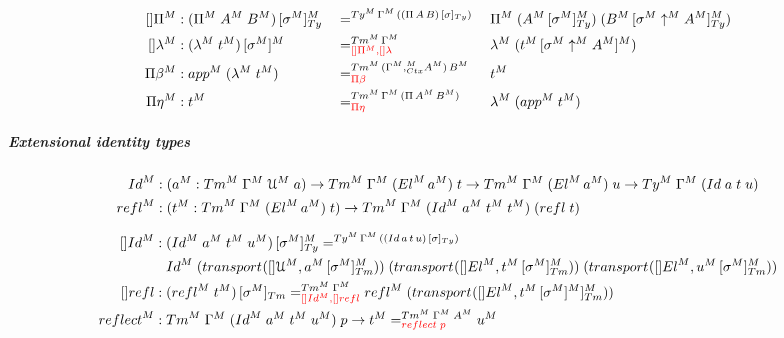 \documentclass[a4paper,UKenglish,numberwithinsect,cleveref,thm-restate]{lipics-v2021}
\begin{document}
\begin{alignat*}{5}
  []\Pi^M         & : \subTyM{(\Pi^M\;A^M\;B^M)}{\sigma^M}  && =^{\Ty^M\,\Gamma^M\,\left(\subTy{(\Pi\,A\,B)}{\sigma}\right)} {} && \Pi^M\;(\subTyM{A^M}{\sigma^M})\;(\subTyM{B^M}{\sigma^M \uparrow^M A^M}) \\
  []\lambda^M     & : \subM{(\lambda^M\;t^M)}{\sigma^M}     && =^{\Tm^M\,\Gamma^M}_{\alert{[]\Pi^M, []\lambda}} {} && \lambda^M\;(\subM{t^M}{\sigma^M \uparrow^M A^M}) \\
  \Pi\beta^M      & : \mathsf{app}^M\;(\lambda^M\;t^M)      && =^{\Tm^M\,(\Gamma^M,_{\Ctx}^M A^M)\,B^M}_{\alert{\Pi\beta}}   {} && t^M  \\
  \Pi\eta^M       & : t^M                                   && =^{\Tm^M\,\Gamma^M\,(\Pi\,A^M\,B^M)}_{\alert{\Pi\eta}}        {} && \lambda^M\;(\mathsf{app}^M\;t^M)
\end{alignat*}

\subparagraph*{Extensional identity types}
\begin{alignat*}{10}
  \mathsf{Id}^M          & : (a^M : \Tm^M\;\Gamma^M\;\UU^M\;a) \to \Tm^M\;\Gamma^M\;(\El^M\,a^M)\;t \to \Tm^M\;\Gamma^M\;(\El^M\,a^M)\;u \to \Ty^M\;\Gamma^M\;(\mathsf{Id}\;a\;t\;u)  \\
  \mathsf{refl}^M        & : (t^M : \Tm^M\;\Gamma^M\;(\El^M\,a^M)\;t) \to \Tm^M\;\Gamma^M\;(\mathsf{Id}^M\;a^M\;t^M\;t^M)\;(\mathsf{refl}\;t) 
\end{alignat*}

\begin{alignat*}{5}
  []\mathsf{Id}^M    :{} & \subTyM{(\mathsf{Id}^M\;a^M\;t^M\;u^M)}{\sigma^M} =^{\Ty^M\,\Gamma^M\,(\subTy{(\mathsf{Id}\,a\,t\,u)}{\sigma})} \\
                         & \mathsf{Id}^M\; (\transfib{}{[]\UU^M}{\subTmM{a^M}{\sigma^M}})\;
                         (\transfib{}{[]\El^M}{\subTmM{t^M}{\sigma^M}})\;
                         (\transfib{}{[]\El^M}{\subTmM{u^M}{\sigma^M}}) \\
  []\mathsf{refl}    :{} & \subTm{(\mathsf{refl}^M\;t^M)}{\sigma^M} =^{\Tm^M\;\Gamma^M}_{\alert{[]\mathsf{Id}^M, []\mathsf{refl}}} {} \mathsf{refl}^M\;(\transfib{%
                         }{[]\El^M}{\subTmM{t^M}{\sigma^M]^M}}) \\
  \mathsf{reflect}^M :{} & \Tm^M\;\Gamma^M\;(\mathsf{Id}^M\;a^M\;t^M\;u^M)\;p \to t^M =^{\Tm^M\;\Gamma^M\;A^M}_{\alert{\mathsf{reflect}\;p}} u^M
\end{alignat*}
\end{document}
